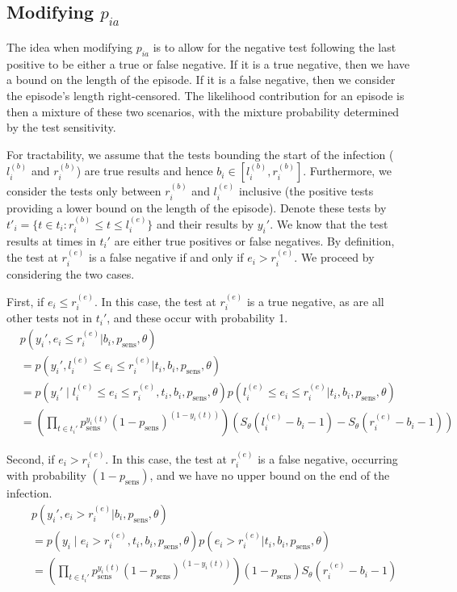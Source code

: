\documentclass[main.tex]{subfiles}
\begin{document}
\subsection{Modifying $p_{ia}$} \label{modifying-p_ia}

The idea when modifying $p_{ia}$ is to allow for the negative test
following the last positive to be either a true or false negative. If it
is a true negative, then we have a bound on the length of the episode.
If it is a false negative, then we consider the episode's length
right-censored. The likelihood contribution for an episode is then a
mixture of these two scenarios, with the mixture probability determined
by the test sensitivity.

For tractability, we assume that the tests bounding the start of the
infection ($l_i^{(b)}$ and $r_i^{(b)}$) are true results and hence
$b_i \in [l_i^{(b)}, r_i^{(b)}]$. Furthermore, we consider the tests
only between $r_i^{(b)}$ and $l_i^{(e)}$ inclusive (the positive
tests providing a lower bound on the length of the episode). Denote
these tests by
$t'_i = \{ t \in t_i : r_i^{(b)} \leq t \leq l_i^{(e)} \}$ and their
results by $y_i'$. We know that the test results at times in $t_i'$
are either true positives or false negatives. By definition, the test at
$r_i^{(e)}$ is a false negative if and only if $e_i > r_i^{(e)}$. We
proceed by considering the two cases.

First, if $e_i \leq r_i^{(e)}$. In this case, the test at
$r_i^{(e)}$ is a true negative, as are all other tests not in
$t_i'$, and these occur with probability 1.
\begin{align}
&p(y_i', e_i \leq r_i^{(e)} | b_i, p_\text{sens}, \theta) \\
&= p(y_i', l_i^{(e)} \leq e_i \leq r_i^{(e)} | t_i, b_i, p_\text{sens}, \theta) \\ %
&= p(y_i' \mid l_i^{(e)} \leq e_i \leq r_i^{(e)}, t_i, b_i, p_\text{sens}, \theta) p(l_i^{(e)} \leq e_i \leq r_i^{(e)} | t_i, b_i, p_\text{sens}, \theta) \\
&= \left( \prod_{t \in t_i'} p_\text{sens}^{y_i(t)} (1 - p_\text{sens})^{(1 - y_i(t))} \right) \left( S_\theta(l_i^{(e)} - b_i - 1) - S_\theta(r_i^{(e)} - b_i - 1) \right)
\end{align}

Second, if $e_i > r_i^{(e)}$. In this case, the test at
$r_i^{(e)}$ is a false negative, occurring with probability
$(1 - p_\text{sens})$, and we have no upper bound on the end of the
infection.
\begin{align}
&p(y_i', e_i > r_i^{(e)} | b_i, p_\text{sens}, \theta) \\
&= p(y_i \mid e_i > r_i^{(e)}, t_i, b_i, p_\text{sens}, \theta) p(e_i > r_i^{(e)} | t_i, b_i, p_\text{sens}, \theta) \\
&= \left( \prod_{t \in t_i'} p_\text{sens}^{y_i(t)} (1 - p_\text{sens})^{(1 - y_i(t))} \right) (1 - p_\text{sens}) S_\theta(r_i^{(e)} - b_i - 1)
\end{align}
\end{document}
